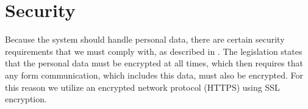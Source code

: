 
\chapter{Security}
\label{cha:security}

Because the system should handle personal data, there are certain security requirements that we must comply with, as described in . The legislation states that the personal data must be encrypted at all times, which then requires that any form communication, which includes this data, must also be encrypted. For this reason we utilize an encrypted network protocol (HTTPS) using SSL encryption.






